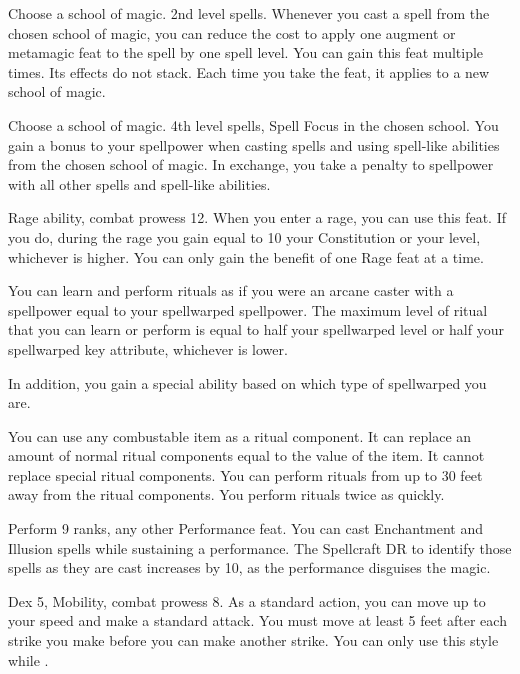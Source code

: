 Choose a school of magic.
\featpre 2nd level spells.
\featben Whenever you cast a spell from the chosen school of magic, you can reduce the cost to apply one augment or metamagic feat to the spell by one spell level.
You can gain this feat multiple times.
Its effects do not stack.
Each time you take the feat, it applies to a new school of magic.

Choose a school of magic.
\featpres 4th level spells, Spell Focus in the chosen school.
\featben You gain a  bonus to your spellpower when casting spells and using spell-like abilities from the chosen school of magic.
In exchange, you take a  penalty to spellpower with all other spells and spell-like abilities.

\featpres Rage ability, combat prowess 12.
\featben When you enter a rage, you can use this feat. If you do, during the rage you gain  equal to 10 \add your Constitution or your level, whichever is higher.
 You can only gain the benefit of one Rage feat at a time.

\featben You can learn and perform rituals as if you were an arcane caster with a spellpower equal to your spellwarped spellpower.
The maximum level of ritual that you can learn or perform is equal to half your spellwarped level or half your spellwarped key attribute, whichever is lower.

In addition, you gain a special ability based on which type of spellwarped you are.

 \x
{}
You can use any combustable item as a ritual component.
It can replace an amount of normal ritual components equal to the value of the item.
It cannot replace special ritual components.
You can perform rituals from up to 30 feet away from the ritual components.
You perform rituals twice as quickly.

\featpres Perform 9 ranks, any other Performance feat.
\featben You can cast Enchantment and Illusion spells while sustaining a performance.
The Spellcraft DR to identify those spells as they are cast increases by 10, as the performance disguises the magic.

\featpres Dex 5, Mobility, combat prowess 8.
\featben As a standard action, you can move up to your speed and make a standard attack.
You must move at least 5 feet after each strike you make before you can make another strike.
You can only use this style while \unencumbered.

